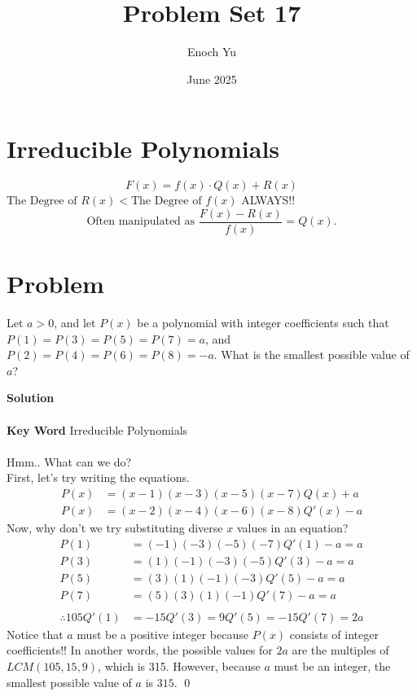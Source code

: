 \documentclass{article}
\title{Problem Set 17}
\author{Enoch Yu}
\date{June 2025}
\newenvironment{solution}{\begin{trivlist}\item[]{\bf Solution}}{\qed \end{trivlist}}
\begin{document}
\section*{Irreducible Polynomials}
\[
F(x)=f(x)\cdot Q(x)+R(x)
\]
$\text{The Degree of $R(x)$} < \text{The Degree of $f(x)$}$ ALWAYS!!
\[
\text{Often manipulated as }\frac{F(x)-R(x)}{f(x)}=Q(x).
\]

\section*{Problem}
Let $a>0$, and let $P(x)$ be a polynomial with integer coefficients such that $P(1)=P(3)=P(5)=P(7)=a$, and $P(2)=P(4)=P(6)=P(8)=-a$. What is the smallest possible value of $a$?
\begin{solution}
\\\\
\textbf{Key Word} Irreducible Polynomials
\\\\
Hmm.. What can we do? \\
First, let's try writing the equations.
\begin{align*}
    P(x) &= (x-1)(x-3)(x-5)(x-7)Q(x)+a \\
    P(x) &= (x-2)(x-4)(x-6)(x-8)Q'(x)-a
\end{align*}
Now, why don't we try substituting diverse $x$ values in an equation?
\begin{align*}
    P(1) &= (-1)(-3)(-5)(-7)Q'(1)-a=a \\
    P(3) &= (1)(-1)(-3)(-5)Q'(3)-a=a \\
    P(5) &= (3)(1)(-1)(-3)Q'(5)-a=a \\
    P(7) &= (5)(3)(1)(-1)Q'(7)-a=a
    \\\\
    \therefore 105Q'(1) &= -15Q'(3) = 9Q'(5) = -15Q'(7) = 2a
\end{align*}
Notice that $a$ must be a positive integer because $P(x)$ consists of integer coefficients!! In another words, the possible values for $2a$ are the multiples of $LCM(105, 15, 9)$, which is 315. However, because $a$ must be an integer, the smallest possible value of $a$ is $\boxed{315}$.
\end{solution}

\newpage
\end{document}
